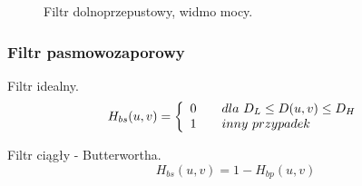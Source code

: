 \documentclass{classrep}
\begin{document}
 \begin{figure}[H]
  \centering
  \caption{Filtr dolnoprzepustowy, widmo mocy.}
  \label{fig_widmo_lena_bp}
\end{figure}

\subsubsection{Filtr pasmowozaporowy}

Filtr idealny.
\begin{equation}
  H_{bs}(u,v) = \left\{
  \begin{array}{l l}
    0 & \quad dla\ D_L \leq D(u,v) \leq D_H \\
    1 & \quad inny\ przypadek \\
  \end{array} \right.
\end{equation}

Filtr ciągły - Butterwortha.
\begin{equation}
H_{bs}(u,v) = 1 - H_{bp}(u,v)
\end{equation}
\end{document}
